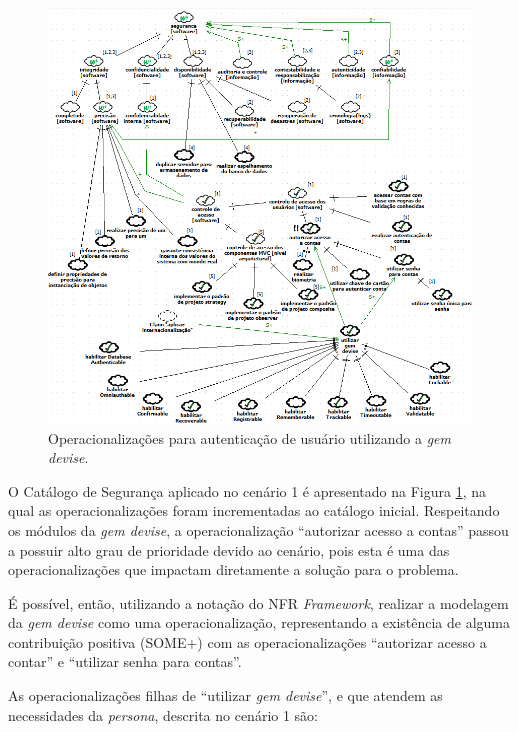 \pagebreak

\begin{figure}[h!]
	\centering
	\includegraphics[keepaspectratio=true,scale=0.7]{figuras/catalogoPersona1.PNG}
	\caption{Operacionalizações para autenticação de usuário utilizando a \textit{gem devise}.}
	\label{catalogoPersona1}
\end{figure}


O Catálogo de Segurança aplicado no cenário 1 é apresentado na Figura \ref{catalogoPersona1}, na qual as operacionalizações foram incrementadas ao catálogo inicial. Respeitando os módulos da \textit{gem devise}, a operacionalização  “autorizar acesso a contas” passou a possuir alto grau de prioridade devido ao cenário, pois esta é uma das operacionalizações que impactam diretamente a solução para o problema. 

É possível, então, utilizando a notação do NFR \textit{Framework}, realizar a modelagem da \textit{gem devise} como uma operacionalização, representando a existência de alguma contribuição positiva (SOME+) com as operacionalizações  “autorizar acesso a contar” e “utilizar senha para contas”.
 
As operacionalizações filhas de “utilizar \textit{gem devise}”, e que atendem as necessidades da \textit{persona}, descrita no cenário 1 são:

